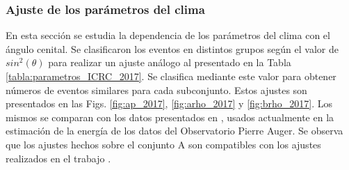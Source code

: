         \subsubsection{Ajuste de los parámetros del clima}
        En esta sección se estudia la dependencia de los parámetros del clima con el ángulo cenital. Se clasificaron los eventos en distintos grupos según el valor de $sin^2(\theta)$ para realizar un ajuste análogo al presentado en la Tabla \ref{tabla:parametros_ICRC_2017}. Se clasifica mediante este valor para obtener números de eventos similares para cada subconjunto. Estos ajustes son presentados en las Figs. \ref{fig:ap_2017}, \ref{fig:arho_2017} y \ref{fig:brho_2017}. Los mismos se comparan con los datos presentados en \cite{aab2017impact}, usados actualmente en la estimación  de la energía de los datos del Observatorio Pierre Auger. Se observa que los ajustes hechos sobre el conjunto A son compatibles con los ajustes realizados en  el trabajo \cite{aab2017impact}. 

